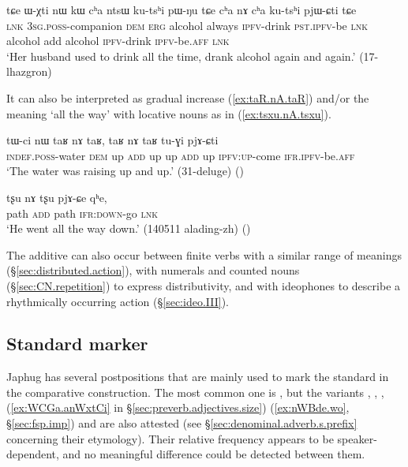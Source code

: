  \begin{exe}
\ex  \label{ex:cha.nA.cha}
\gll  tɕe ɯ-χti nɯ kɯ cʰa ntsɯ ku-tsʰi pɯ-ŋu tɕe cʰa nɤ cʰa ku-tsʰi pjɯ-ɕti tɕe \\
\textsc{lnk} \textsc{3sg}.\textsc{poss}-companion \textsc{dem} \textsc{erg} alcohol always \textsc{ipfv}-drink \textsc{pst}.\textsc{ipfv}-be \textsc{lnk} alcohol add alcohol \textsc{ipfv}-drink \textsc{ipfv}-be.\textsc{aff} \textsc{lnk} \\
\glt  `Her husband used to drink all the time, drank alcohol again and again.' (17-lhazgron)
\end{exe} 

It can also be interpreted as gradual increase (\ref{ex:taR.nA.taR}) and/or the meaning `all the way' with locative nouns as in (\ref{ex:tsxu.nA.tsxu}).

\begin{exe}
\ex  \label{ex:taR.nA.taR}
\gll tɯ-ci nɯ taʁ nɤ taʁ, taʁ nɤ taʁ tu-ɣi pjɤ-ɕti \\
\textsc{indef}.\textsc{poss}-water  \textsc{dem} up \textsc{add}  up up \textsc{add} up \textsc{ipfv}:\textsc{up}-come \textsc{ifr}.\textsc{ipfv}-be.\textsc{aff} \\
\glt `The water was raising up and up.' (31-deluge)
()
\end{exe} 

\begin{exe}
\ex  \label{ex:tsxu.nA.tsxu}
\gll  tʂu nɤ tʂu pjɤ-ɕe qʰe, \\
path \textsc{add} path \textsc{ifr}:\textsc{down}-go \textsc{lnk} \\
\glt `He went all the way down.' (140511 alading-zh) ()
\end{exe} 

The additive can also occur between finite verbs with a similar range of meanings (§\ref{sec:distributed.action}), with numerals and counted nouns (§\ref{sec:CN.repetition}) to express distributivity, and with ideophones to describe a rhythmically occurring action (§\ref{sec:ideo.III}).

\subsection{Standard marker} \label{sec:comparative} 
Japhug has several postpositions that are mainly used to mark the standard in the comparative construction. The most common one is , but the variants , , ,  (\ref{ex:WCGa.anWxtCi} in §\ref{sec:preverb.adjectives.size})   (\ref{ex:nWBde.wo}, §\ref{sec:fsp.imp}) and  are also attested (see §\ref{sec:denominal.adverb.s.prefix} concerning their etymology). Their relative frequency appears to be speaker-dependent, and no meaningful difference could be detected between them. 

